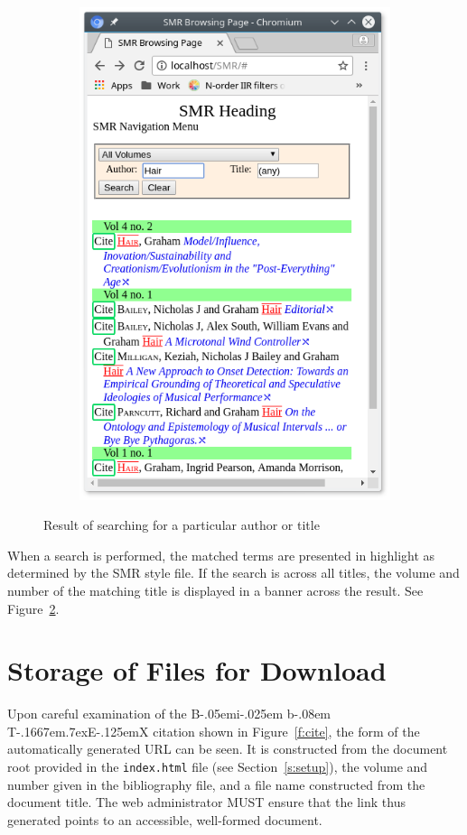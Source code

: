 \documentclass[a4paper,10pt]{SMR}
\def\BibTeX{{\rm B\kern-.05em{\sc i\kern-.025em b}\kern-.08em
    T\kern-.1667em\lower.7ex\hbox{E}\kern-.125emX}}
\begin{document}
\begin{figure}
\begin{subfigure}[t]{0.45\textwidth}
  \includegraphics[width=\textwidth]{SMR_page-search-all.png}
  \label{sf:allvols}
 \end{subfigure}
 \caption{Result of searching for a particular author or title}
 \label{f:searchresult}
\end{figure}
When a search is performed, the matched terms are presented in highlight
as determined by the SMR style file. If the search is across all titles,
the volume and number of the matching title is displayed in a banner
across the result. See Figure~\ref{f:searchresult}.

\section{Storage of Files for Download}
Upon careful examination of the \BibTeX{} citation shown in
Figure~\ref{f:cite}, the form of the automatically generated
URL can be seen. It is constructed from the document root provided
in the \texttt{index.html} file (see Section~\ref{s:setup}),
the volume and number given in the bibliography file, and
a file name constructed from the document title.
The web administrator MUST ensure that the link thus
generated points to an accessible, well-formed document.
\end{document}
